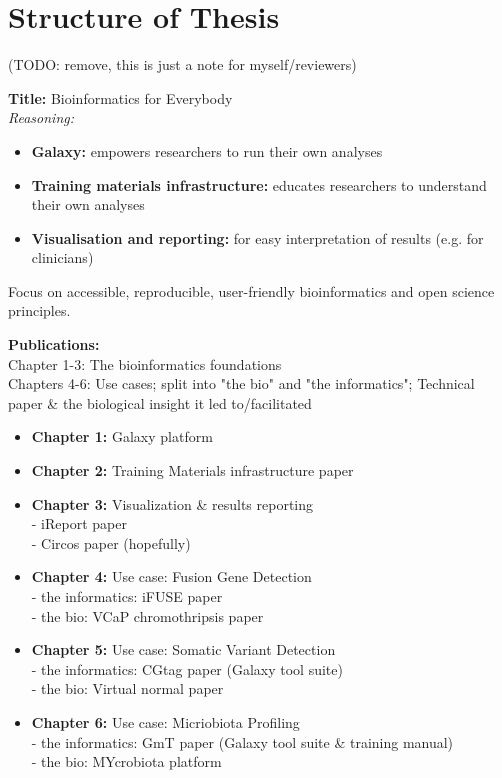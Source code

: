 \chapter*{Structure of Thesis}
\vspace{-2cm}
(TODO: remove, this is just a note for myself/reviewers)


\textbf{Title: } Bioinformatics for Everybody \\
\textit{Reasoning: }\vspace{-1.8em}
\begin{itemize}
\itemsep-0.5em
  \item \textbf{Galaxy:} empowers researchers to run their own analyses
  \item \textbf{Training materials infrastructure:} educates researchers to understand their own analyses
  \item \textbf{Visualisation and reporting:} for easy interpretation of results (e.g. for clinicians)
\end{itemize}
\vspace{-1.8em}
Focus on accessible, reproducible, user-friendly bioinformatics and open science principles.


\textbf{Publications:} \\

Chapter 1-3: The bioinformatics foundations \\
Chapters 4-6: Use cases; split into "the bio" and "the informatics"; Technical paper \& the biological insight it led to/facilitated \\

\begin{itemize}
\itemsep-0.5em
\item \textbf{Chapter 1:} Galaxy platform \\
\item \textbf{Chapter 2:} Training Materials infrastructure paper \\
\item \textbf{Chapter 3:} Visualization \& results reporting \\
  - iReport paper \\
  - Circos paper (hopefully)
\item \textbf{Chapter 4:} Use case: Fusion Gene Detection \\
  - the informatics: iFUSE paper \\
  - the bio: VCaP chromothripsis paper
\item \textbf{Chapter 5:} Use case: Somatic Variant Detection \\
  - the informatics: CGtag paper (Galaxy tool suite) \\
  - the bio: Virtual normal paper
\item \textbf{Chapter 6:} Use case: Micriobiota Profiling \\
  - the informatics: GmT paper (Galaxy tool suite \& training manual) \\
  - the bio: MYcrobiota platform
\end{itemize}

